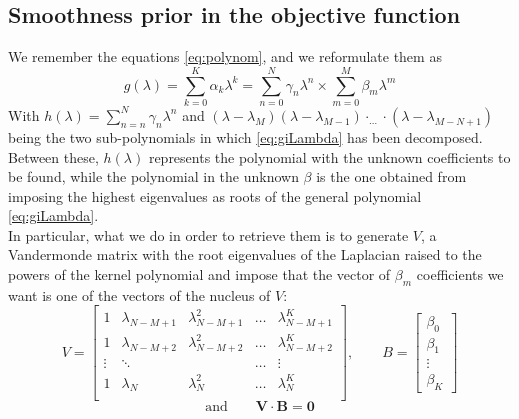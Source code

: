 \subsection{Smoothness prior in the objective function}
We remember the equations \ref{eq:polynom}, and we reformulate them as
\begin{equation}
  g(\lambda) = \sum_{k=0}^K\alpha_k \lambda^k = \sum_{n=0}^N\gamma_n \lambda^n \times \sum_{m=0}^M  \beta_m \lambda^m
  \label{eq:giLambda}
\end{equation}
With $h(\lambda) = \sum_{n=n}^N \gamma_n \lambda^n$ and $(\lambda - \lambda_M)(\lambda - \lambda_{M-1})\cdot_{\dots}\cdot (\lambda - \lambda_{M - N +1})$ being the two sub-polynomials in which \ref{eq:giLambda} has been decomposed. Between these, $h(\lambda)$ represents the polynomial with the unknown coefficients to be found, while the polynomial in the unknown $\beta$ is the one obtained from imposing the highest eigenvalues as roots of the general polynomial \ref{eq:giLambda}.\\
In particular, what we do in order to retrieve them is to generate $V$, a Vandermonde matrix with the root eigenvalues of the Laplacian raised to the powers of the kernel polynomial and impose that the vector of $\beta_m$ coefficients we want is one of the vectors of the nucleus of $V$:
\begin{equation}
  V=
  \begin{bmatrix}
    1 & \lambda_{N-M+1} & \lambda_{N-M+1}^2 & \dots & \lambda_{N-M+1}^K\\
    1 & \lambda_{N-M+2} & \lambda_{N-M+2}^2 & \dots & \lambda_{N-M+2}^K\\
    \vdots & \ddots     &                   & \dots & \vdots\\
    1 & \lambda_N &       \lambda_N^2       & \dots & \lambda_N^K\\
  \end{bmatrix}
  , \qquad B=
  \begin{bmatrix}
    \beta_0\\
    \beta_1\\
    \vdots\\
    \beta_K
  \end{bmatrix}
\end{equation}
\begin{equation}
  \text{and} \qquad \textbf{V}\cdot \textbf{B} = \textbf{0}
\end{equation}

